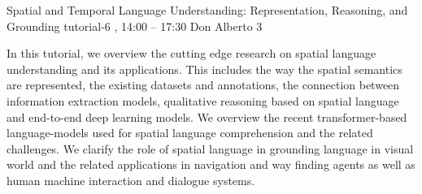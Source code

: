 %

\clearpage
\begin{tutorial}
  {Spatial and Temporal Language Understanding: Representation, Reasoning, and Grounding}
  {tutorial-6}
  {\daydateyear, 14:00 -- 17:30}
  {Don Alberto 3}

In this tutorial, we overview the cutting edge research on spatial language understanding and its applications. This includes the way the spatial semantics are represented, the existing datasets and annotations, the connection between information extraction models, qualitative reasoning based on spatial language and end-to-end deep learning models. We overview the recent transformer-based language-models used for spatial language comprehension and the related challenges. We clarify the role of spatial language in grounding language in visual world and the related applications in navigation and way finding agents as well as human machine interaction and dialogue systems.

\end{tutorial}
